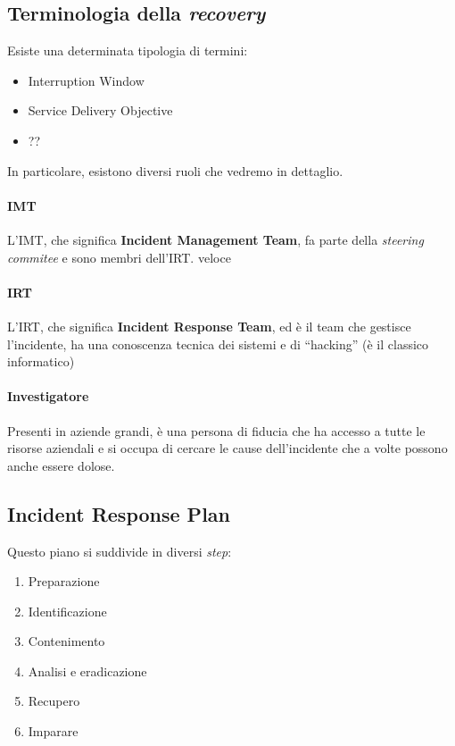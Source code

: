 \subsection{Terminologia della \textit{recovery}}
Esiste una determinata tipologia di termini:
\begin{itemize}
\item Interruption Window
\item Service Delivery Objective
\item ?? 
\end{itemize}

In particolare, esistono diversi ruoli che vedremo in dettaglio.

\paragraph*{IMT} L'IMT, che significa \textbf{Incident Management Team}, fa
parte della \textit{steering commitee} e sono membri dell'IRT. %
veloce




\paragraph*{IRT} L'IRT, che significa \textbf{Incident Response Team}, ed è il
team che gestisce l'incidente, ha una conoscenza tecnica dei sistemi e di
``hacking'' (è il classico informatico)

\paragraph*{Investigatore} Presenti in aziende grandi, è una persona di fiducia
che ha accesso a tutte le risorse aziendali e si occupa di cercare le cause
dell'incidente che a volte possono anche essere dolose.



\subsection{Incident Response Plan}

Questo piano si suddivide in diversi \textit{step}:
\begin{enumerate}
\item Preparazione
\item Identificazione
\item Contenimento
\item Analisi e eradicazione
\item Recupero
\item Imparare
\end{enumerate}

